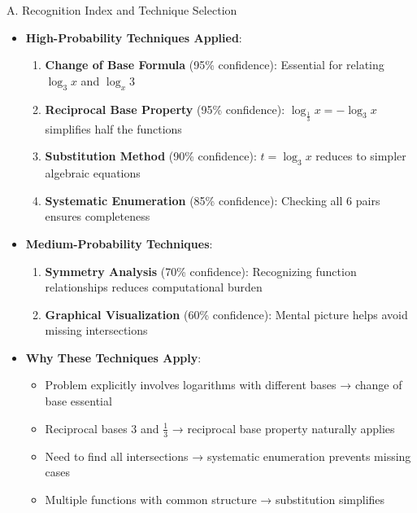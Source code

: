 \documentclass[12pt]{article}
\begin{document}
\begin{conversionbox}{A. Recognition Index and Technique Selection}
\begin{itemize}[leftmargin=*]
    \item \textbf{High-Probability Techniques Applied}:
    \begin{enumerate}
        \item \textbf{Change of Base Formula} (95\% confidence): Essential for relating $\log_3 x$ and $\log_x 3$
        \item \textbf{Reciprocal Base Property} (95\% confidence): $\log_{\frac{1}{3}} x = -\log_3 x$ simplifies half the functions
        \item \textbf{Substitution Method} (90\% confidence): $t = \log_3 x$ reduces to simpler algebraic equations
        \item \textbf{Systematic Enumeration} (85\% confidence): Checking all 6 pairs ensures completeness
    \end{enumerate}
    
    \item \textbf{Medium-Probability Techniques}:
    \begin{enumerate}
        \item \textbf{Symmetry Analysis} (70\% confidence): Recognizing function relationships reduces computational burden
        \item \textbf{Graphical Visualization} (60\% confidence): Mental picture helps avoid missing intersections
    \end{enumerate}
    
    \item \textbf{Why These Techniques Apply}:
    \begin{itemize}
        \item Problem explicitly involves logarithms with different bases → change of base essential
        \item Reciprocal bases $3$ and $\frac{1}{3}$ → reciprocal base property naturally applies
        \item Need to find all intersections → systematic enumeration prevents missing cases
        \item Multiple functions with common structure → substitution simplifies
    \end{itemize}
\end{itemize}
\end{conversionbox}
\end{document}
